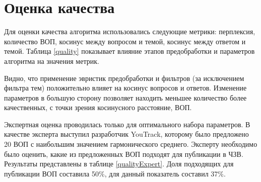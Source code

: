 \chapter{Оценка качества}
\label{chap:quality}

Для оценки качества алгоритма использовались следующие метрики: перплексия, количество ВОП, косинус между вопросом и темой, косинус между ответом и темой. Таблица \ref{quality} показывает влияние этапов предобработки и параметров алгоритма на значения метрик.

Видно, что применение эвристик предобработки и фильтров (за исключением фильтра тем) положительно влияет на косинус вопросов и ответов. Изменение параметров в большую сторону позволяет находить меньшее количество более качественных, с точки зрения косинусного расстояние, ВОП.

Экспертная оценка проводилась только для оптимального набора параметров. В качестве эксперта выступил разработчик YouTrack, которому было предложено 20 ВОП с наибольшим значением гармонического среднего. Эксперту необходимо было оценить, какие из предложенных ВОП подходят для публикации в ЧЗВ. Результаты представлены в таблице \ref{qualityExpert}. Доля подходящих для публикации ВОП составила 50\%, для \cite{original} данный показатель составил 37\%. 

